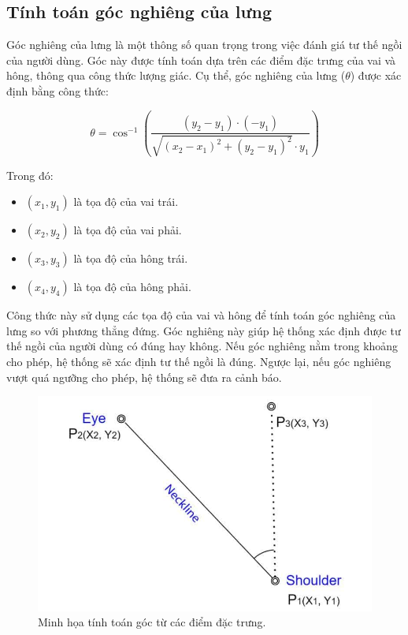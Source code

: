 \documentclass[conference]{IEEEtran}
\begin{document}
\subsection{Tính toán góc nghiêng của lưng}
Góc nghiêng của lưng là một thông số quan trọng trong việc đánh giá tư thế ngồi của người dùng. Góc này được tính toán dựa trên các điểm đặc trưng của vai và hông, thông qua công thức lượng giác. Cụ thể, góc nghiêng của lưng (\(\theta\)) được xác định bằng công thức:

\begin{equation}
\theta = \cos^{-1}\left( \frac{(y_2 - y_1) \cdot (-y_1)}{\sqrt{(x_2 - x_1)^2 + (y_2 - y_1)^2} \cdot y_1} \right)
\end{equation}

Trong đó:
\begin{itemize}
    \item \((x_1, y_1)\) là tọa độ của vai trái.
    \item \((x_2, y_2)\) là tọa độ của vai phải.
    \item \((x_3, y_3)\) là tọa độ của hông trái.
    \item \((x_4, y_4)\) là tọa độ của hông phải.
\end{itemize}

Công thức này sử dụng các tọa độ của vai và hông để tính toán góc nghiêng của lưng so với phương thẳng đứng. Góc nghiêng này giúp hệ thống xác định được tư thế ngồi của người dùng có đúng hay không. Nếu góc nghiêng nằm trong khoảng cho phép, hệ thống sẽ xác định tư thế ngồi là đúng. Ngược lại, nếu góc nghiêng vượt quá ngưỡng cho phép, hệ thống sẽ đưa ra cảnh báo.

\begin{figure}[H]
    \centering
    \includegraphics[width=0.9\linewidth]{images/angle_calculation.png}
    \caption{Minh họa tính toán góc từ các điểm đặc trưng.}
    \label{fig:angle_calculation}
\end{figure}
\end{document}
